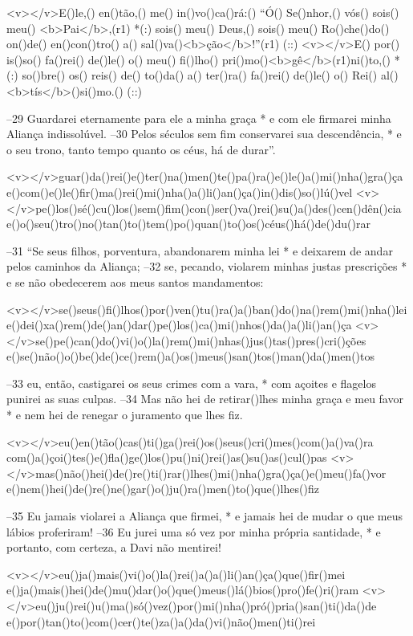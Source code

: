 <v></v>E()le,() en()tão,() me() in()vo()ca()rá:() ``Ó() Se()nhor,() vós() sois() meu() <b>Pai</b>,(r1) *(:)
sois() meu() Deus,() sois() meu() Ro()che()do() on()de() en()con()tro() a() sal()va()<b>ção</b>!''(r1) (::)
<v></v>E() por() is()so() fa()rei() de()le() o() meu() fi()lho() pri()mo()<b>gê</b>(r1)ni()to,() *(:)
so()bre() os() reis() de() to()da() a() ter()ra() fa()rei() de()le() o() Rei() al()<b>tís</b>()si()mo.() (::)

–29 Guardarei eternamente para ele a minha graça *
e com ele firmarei minha Aliança indissolúvel. 
–30 Pelos séculos sem fim conservarei sua descendência, *
e o seu trono, tanto tempo quanto os céus, há de durar”.

<v></v>guar()da()rei()e()ter()na()men()te()pa()ra()e()le()a()mi()nha()gra()ça
e()com()e()le()fir()ma()rei()mi()nha()a()li()an()ça()in()dis()so()lú()vel
<v></v>pe()los()sé()cu()los()sem()fim()con()ser()va()rei()su()a()des()cen()dên()cia
e()o()seu()tro()no()tan()to()tem()po()quan()to()os()céus()há()de()du()rar

–31 “Se seus filhos, porventura, abandonarem minha lei *
e deixarem de andar pelos caminhos da Aliança; 
–32 se, pecando, violarem minhas justas prescrições *
e se não obedecerem aos meus santos mandamentos:

<v></v>se()seus()fi()lhos()por()ven()tu()ra()a()ban()do()na()rem()mi()nha()lei
e()dei()xa()rem()de()an()dar()pe()los()ca()mi()nhos()da()a()li()an()ça
<v></v>se()pe()can()do()vi()o()la()rem()mi()nhas()jus()tas()pres()cri()ções
e()se()não()o()be()de()ce()rem()a()os()meus()san()tos()man()da()men()tos

–33 eu, então, castigarei os seus crimes com a vara, *
com açoites e flagelos punirei as suas culpas. 
–34 Mas não hei de retirar()lhes minha graça e meu favor *
e nem hei de renegar o juramento que lhes fiz.

<v></v>eu()en()tão()cas()ti()ga()rei()os()seus()cri()mes()com()a()va()ra
com()a()çoi()tes()e()fla()ge()los()pu()ni()rei()as()su()as()cul()pas
<v></v>mas()não()hei()de()re()ti()rar()lhes()mi()nha()gra()ça()e()meu()fa()vor
e()nem()hei()de()re()ne()gar()o()ju()ra()men()to()que()lhes()fiz

–35 Eu jamais violarei a Aliança que firmei, *
e jamais hei de mudar o que meus lábios proferiram! 
–36 Eu jurei uma só vez por minha própria santidade, *
e portanto, com certeza, a Davi não mentirei!

<v></v>eu()ja()mais()vi()o()la()rei()a()a()li()an()ça()que()fir()mei
e()ja()mais()hei()de()mu()dar()o()que()meus()lá()bios()pro()fe()ri()ram
<v></v>eu()ju()rei()u()ma()só()vez()por()mi()nha()pró()pria()san()ti()da()de
e()por()tan()to()com()cer()te()za()a()da()vi()não()men()ti()rei

